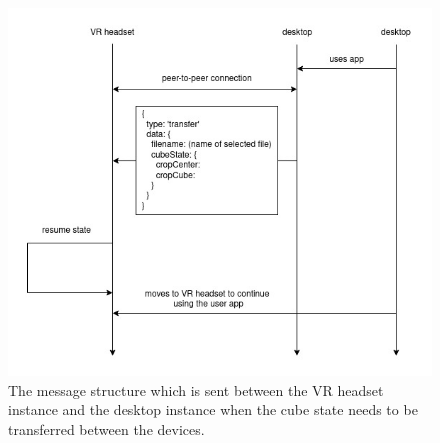\begin{figure}
    \centering
    \includegraphics[width=0.6\linewidth]{figures/transfer-cube-state.jpg}
    \caption{The message structure which is sent between the VR headset instance and the desktop instance when the cube state needs to be transferred between the devices.}
    \label{fig:transfer-cube-state}
\end{figure}

